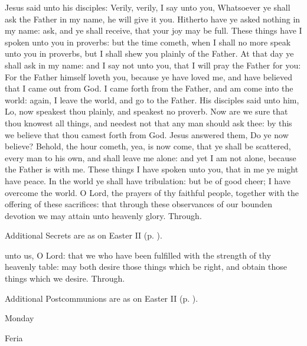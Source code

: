  Jesus said unto his disciples: Verily, verily, I say unto you, Whatsoever ye shall ask the Father in my name, he will give it you. Hitherto have ye asked nothing in my name: ask, and ye shall receive, that your joy may be full. These things have I spoken unto you in proverbs: but the time cometh, when I shall no more speak unto you in proverbs, but I shall shew you plainly of the Father. At that day ye shall ask in my name: and I say not unto you, that I will pray the Father for you: For the Father himself loveth you, because ye have loved me, and have believed that I came out from God. I came forth from the Father, and am come into the world: again, I leave the world, and go to the Father. His disciples said unto him, Lo, now speakest thou plainly, and speakest no proverb. Now are we sure that thou knowest all things, and needest not that any man should ask thee: by this we believe that thou camest forth from God. Jesus answered them, Do ye now believe? Behold, the hour cometh, yea, is now come, that ye shall be scattered, every man to his own, and shall leave me alone: and yet I am not alone, because the Father is with me. These things I have spoken unto you, that in me ye might have peace. In the world ye shall have tribulation: but be of good cheer; I have overcome the world.
\clearpage
{}
\secret
{} O Lord, the prayers of thy faithful people, together with the offering of these sacrifices: that through these observances of our bounden devotion we may attain unto heavenly glory. Through.
\begin{rubric}
    Additional Secrets are as on Easter II (p. \pageref{EasterII}).
\end{rubric}
\postcommunion
{} unto us, O Lord: that we who have been fulfilled with the strength of thy heavenly table: may both desire those things which be right, and obtain those things which we desire. Through.
\begin{rubric}
    Additional Postcommunions are as on Easter II (p. \pageref{EasterII}).
\end{rubric}

\par\noindent
\begin{inhead}
    Monday\par
  Feria
\end{inhead}

